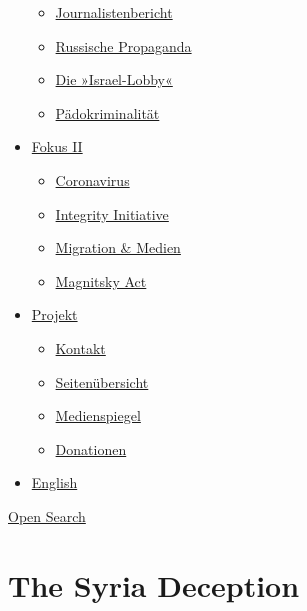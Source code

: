 \begin{itemize}
  \begin{itemize}
  \tightlist
  \item
    \href{https://swprs.org/bericht-eines-journalisten/}{Journalistenbericht}
  \item
    \href{https://swprs.org/russische-propaganda/}{Russische Propaganda}
  \item
    \href{https://swprs.org/die-israel-lobby-fakten-und-mythen/}{Die
    »Israel-Lobby«}
  \item
    \href{https://swprs.org/geopolitik-und-paedokriminalitaet/}{Pädokriminalität}
  \end{itemize}
\item
  \href{https://swprs.org/migration-und-medien/}{Fokus II}

  \begin{itemize}
  \tightlist
  \item
    \href{https://swprs.org/covid-19-hinweis-ii/}{Coronavirus}
  \item
    \href{https://swprs.org/die-integrity-initiative/}{Integrity
    Initiative}
  \item
    \href{https://swprs.org/migration-und-medien/}{Migration \& Medien}
  \item
    \href{https://swprs.org/der-fall-magnitsky/}{Magnitsky Act}
  \end{itemize}
\item
  \href{https://swprs.org/kontakt/}{Projekt}

  \begin{itemize}
  \tightlist
  \item
    \href{https://swprs.org/kontakt/}{Kontakt}
  \item
    \href{https://swprs.org/uebersicht/}{Seitenübersicht}
  \item
    \href{https://swprs.org/medienspiegel/}{Medienspiegel}
  \item
    \href{https://swprs.org/donationen/}{Donationen}
  \end{itemize}
\item
  \href{https://swprs.org/contact/}{English}
\end{itemize}

\protect\hyperlink{}{Open Search}

\hypertarget{the-syria-deception}{%
\section{The Syria Deception}\label{the-syria-deception}}

